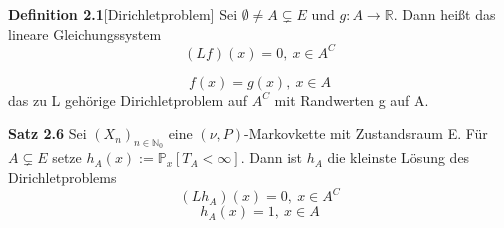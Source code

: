 \textbf{Definition 2.1}[Dirichletproblem]
Sei $\emptyset \neq A \subsetneq E$ und $g: A \to \mathbb{R}$. Dann heißt das lineare Gleichungssystem 
\begin{equation*}
(Lf)(x) = 0, \: x \in A^{C}
\end{equation*}

 \begin{equation*}
f(x) = g(x), \: x \in A
\end{equation*}
\noindent
das zu L gehörige Dirichletproblem auf $A^{C}$ mit Randwerten g auf A.     

\textbf{Satz 2.6}
\label{Dirichletsatz}
Sei $(X_{n})_{n \in \mathbb{N}_{0}}$ eine $(\nu,P)$-Markovkette mit Zustandsraum E. Für $A \subsetneq E$ setze $h_{A}(x) := \mathbb{P}_{x}[T_{A} < \infty] $. Dann ist $h_{A}$ die kleinste Lösung des Dirichletproblems
\begin{equation*}
(Lh_{A})(x) = 0, \: x \in A^{C}
\end{equation*}
\begin{equation*}
h_{A}(x) = 1, \: x \in A
\end{equation*}

